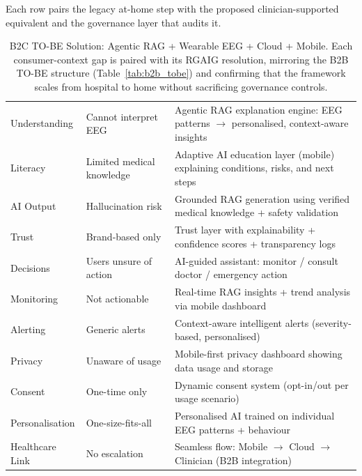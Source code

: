 \noindent Each row pairs the legacy at-home step with the proposed clinician-supported equivalent and the governance layer that audits it.
{\tablestripes\tablefontsize
{}
\begin{xltabular}{\textwidth}{@{} >{\raggedright\arraybackslash}p{3.0cm} >{\raggedright\arraybackslash}p{3.2cm} L @{}}
\caption[B2C TO-BE Solution: Agentic RAG + Wearable EEG + Cloud +]{B2C TO-BE Solution: Agentic RAG + Wearable EEG + Cloud + Mobile. Each consumer-context gap is paired with its RGAIG resolution, mirroring the B2B TO-BE structure (Table~\ref{tab:b2b_tobe}) and confirming that the framework scales from hospital to home without sacrificing governance controls.}\label{tab:b2c_tobe} \\
\toprule
{} &  &  \\
\midrule
\endfirsthead
\endhead
\bottomrule
\endlastfoot
Understanding & Cannot interpret EEG & Agentic RAG explanation engine: EEG patterns $\to$ personalised, context-aware insights \\
\addlinespace
Literacy & Limited medical knowledge & Adaptive AI education layer (mobile) explaining conditions, risks, and next steps \\
\addlinespace
AI Output & Hallucination risk & Grounded RAG generation using verified medical knowledge + safety validation \\
\addlinespace
Trust & Brand-based only & Trust layer with explainability + confidence scores + transparency logs \\
\addlinespace
Decisions & Users unsure of action & AI-guided assistant: monitor / consult doctor / emergency action \\
\addlinespace
Monitoring & Not actionable & Real-time RAG insights + trend analysis via mobile dashboard \\
\addlinespace
Alerting & Generic alerts & Context-aware intelligent alerts (severity-based, personalised) \\
\addlinespace
Privacy & Unaware of usage & Mobile-first privacy dashboard showing data usage and storage \\
\addlinespace
Consent & One-time only & Dynamic consent system (opt-in/out per usage scenario) \\
\addlinespace
Personalisation & One-size-fits-all & Personalised AI trained on individual EEG patterns + behaviour \\
\addlinespace
Healthcare Link & No escalation & Seamless flow: Mobile $\to$ Cloud $\to$ Clinician (B2B integration) \\

\end{xltabular}}
